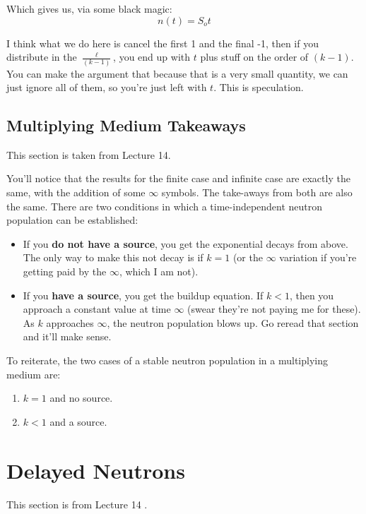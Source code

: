 \documentclass[letter]{article}
\begin{document}
Which gives us, via some black magic:
\begin{equation*}
  n(t)=S_ot
\end{equation*}

I think what we do here is cancel the first 1 and the final -1, then
if you distribute in the $\frac{\ell}{(k-1)}$, you end up with $t$
plus stuff on the order of $(k-1)$. You can make the argument that
because that is a very small quantity, we can just ignore all of them,
so you're just left with $t$. This is speculation.

\subsection{Multiplying Medium Takeaways}

This section is taken from Lecture 14\cite{lecture}.

\vspace{10pt}
You'll notice that the results for the finite case and infinite case
are exactly the same, with the addition of some $\infty$ symbols. The
take-aways from both are also the same. There are two conditions in
which a time-independent neutron population can be established:

\begin{itemize}
\item If you \textbf{do not have a source}, you get the exponential
  decays from above. The only way to make this not decay is if $k=1$
  (or the $\infty$ variation if you're getting paid by the $\infty$,
  which I am not).
\item If you \textbf{have a source}, you get the buildup equation. If
  $k<1$, then you approach a constant value at time $\infty$ (swear
  they're not paying me for these). As $k$ approaches $\infty$, the
  neutron population blows up. Go reread that section and it'll make sense.
\end{itemize}

To reiterate, the two cases of a stable neutron population in a
multiplying medium are:
\begin{enumerate}
\item $k=1$ and no source.
\item $k<1$ and a source.
\end{enumerate}

\section{Delayed Neutrons}
\label{delayedNeutrons}
This section is from Lecture 14 \cite{lecture}.
\end{document}
